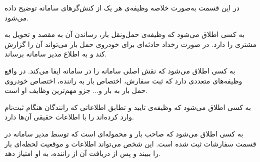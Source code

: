 در این قسمت به‌صورت خلاصه وظیفه‌ی هر یک از  کنش‌گرهای سامانه توضیح داده می‌شود.

 به کسی اطلاق می‌شود که وظیفه‌ی حمل‌ونقل بار، رساندن آن به مقصد و تحویل به مشتری را دارد. در صورت رخداد حادثه‌ای برای خودروی حمل بار می‌تواند آن را گزارش کند و به اطلاع مدیر سامانه برساند.

به کسی اطلاق می‌شود که نقش اصلی سامانه را در سامانه ایفا می‌کند. در واقع وظیفه‌های متعددی دارد که ثبت سفارش، اختصاص بار به راننده، اختصاص خودروی حمل بار به بار و... جزو مهم‌ترین وظایف او است.

به کسی اطلاق می‌شود که وظیفه‌ی تایید و تطابق اطلاعاتی که رانندگان هنگام ثبت‌نام وارد کرده‌اند را با اطلاعات حقیقی آن‌ها دارد.

به کسی اطلاق می‌شود که صاحب بار و محموله‌ای است که توسط مدیر سامانه در قسمت سفارشات ثبت شده است. این شخص می‌تواند اطلاعات و موقعیت لحظه‌ای بار را ببیند و پس از دریافت آن از راننده، به او امتیاز دهد.

